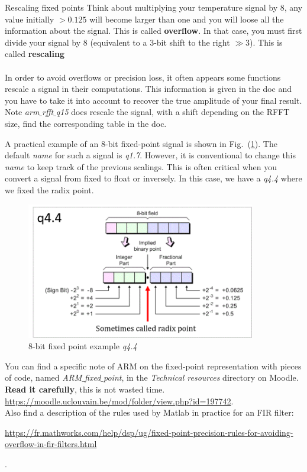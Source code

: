 \begin{bclogo}[couleur = gray!20, arrondi = 0.2, logo=\bcinfo]{Rescaling fixed points}
Think about multiplying your temperature signal by $8$, any value initially $>0.125$ will become larger than one and you will loose all the information about the signal. This is called \textbf{overflow}. In that case, you must first divide your signal by $8$ (equivalent to a $3$-bit shift to the right $\gg 3$).
This is called \textbf{rescaling} \\
\\
 In order to avoid overflows or precision loss, it often appears some functions rescale a signal in their computations. This information is given in the doc and you have to take it into account to recover the true amplitude of your final result. Note \emph{arm$\_$rfft$\_$q15} does rescale the signal, with a shift depending on the RFFT size, find the corresponding table in the doc.
\end{bclogo}
%
A practical example of an $8$-bit fixed-point signal is shown in Fig.~(\ref{fig: q4_4}). The default \textit{name} for such a signal is \emph{q1.7}. However, it is conventional to change this \textit{name} to keep track of the previous scalings. This is often critical when you convert a signal from fixed to float or inversely.
In this case, we have a \emph{q4.4} where we fixed the radix point.
%
\begin{figure}[H]
    \centering
    \includegraphics[width=10cm]{figs/fixed4_4.png}
    \caption{8-bit fixed point example \emph{q4.4}}
    \label{fig: q4_4}
\end{figure}
%
You can find a specific note of ARM on the fixed-point representation with pieces of code, named \emph{ARM$\_$fixed$\_$point}, in the \emph{Technical resources} directory on Moodle. \textbf{Read it carefully}, this is not wasted time. \\ \url{https://moodle.uclouvain.be/mod/folder/view.php?id=197742}. \\
Also find a description of the rules used by Matlab in practice for an FIR filter: \\ \begin{footnotesize}\url{https://fr.mathworks.com/help/dsp/ug/fixed-point-precision-rules-for-avoiding-overflow-in-fir-filters.html}\end{footnotesize}.
